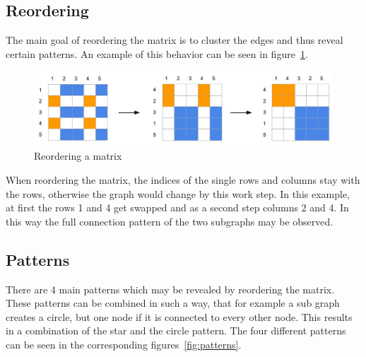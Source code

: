 \subsection{Reordering}

The main goal of reordering the matrix is to cluster the edges and thus reveal certain patterns. An example of this behavior can be seen in figure~\ref{fig:reorder}. 

\begin{figure}[h]
\includegraphics[width=\textwidth]{images/reorder}
\caption{Reordering a matrix\label{fig:reorder}}
\end{figure}


When reordering the matrix, the indices of the single rows and columns stay with the rows, otherwise the graph would change by this work step. In this example, at first the rows 1 and 4 get swapped and as a second step columns 2 and 4. In this way the full connection pattern of the two subgraphs may be observed. 

\subsection{Patterns}
There are 4 main patterns which may be revealed by reordering the matrix. These patterns can be combined in such a way, that for example a sub graph creates a circle, but one node if it is connected to every other node. This results in a combination of the star and the circle pattern. 
The four different patterns can be seen in the corresponding figures~\ref{fig:patterns}.

